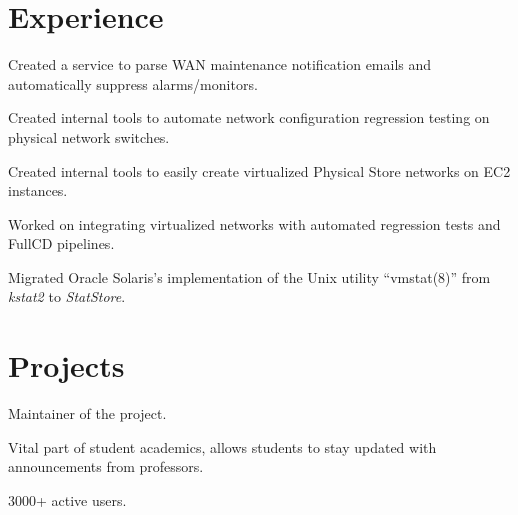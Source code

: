 \documentclass[]{abhijeet_viswa-deedy-resume-openfont}
\begin{document}
\hfill
\begin{minipage}[t]{0.70\textwidth}

\section{Experience}

\subsectionsep
\begin{tightemize}
\item Created a service to parse WAN maintenance notification emails and
automatically suppress alarms/monitors.
\item Created internal tools to automate network configuration regression
testing on physical network switches.
\item Created internal tools to easily create virtualized Physical Store
networks on EC2 instances.
\item Worked on integrating virtualized networks with automated regression
tests and FullCD pipelines.
\end{tightemize}
\subsectionsep

\begin{tightemize}
\item Migrated Oracle Solaris's implementation of the Unix
utility ``vmstat(8)'' from \textit{kstat2} to \textit{StatStore}.
\end{tightemize}

\section{Projects}
\begin{tightemize}
\item Maintainer of the project.
\item Vital part of student academics, allows students to stay updated with announcements from professors.
\item 3000+ active users.
\end{tightemize}
\subsectionsep


\end{minipage}
\end{document}
